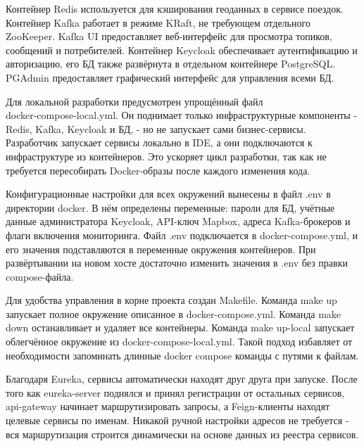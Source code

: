 {\par \redline Контейнер Redis используется для кэширования геоданных в сервисе поездок. Контейнер Kafka работает в режиме KRaft, не требующем отдельного ZooKeeper. Kafka UI предоставляет веб-интерфейс для просмотра топиков, сообщений и потребителей. Контейнер Keycloak обеспечивает аутентификацию и авторизацию, его БД также развёрнута в отдельном контейнере PostgreSQL. PGAdmin предоставляет графический интерфейс для управления всеми БД.

\par \redline Для локальной разработки предусмотрен упрощённый файл \\docker-compose-local.yml. Он поднимает только инфраструктурные компоненты - Redis, Kafka, Keycloak и БД, - но не запускает сами бизнес-сервисы. Разработчик запускает сервисы локально в IDE, а они подключаются к инфраструктуре из контейнеров. Это ускоряет цикл разработки, так как не требуется пересобирать Docker-образы после каждого изменения кода.

\par \redline Конфигурационные настройки для всех окружений вынесены в файл .env в директории docker. В нём определены переменные: пароли для БД, учётные данные администратора Keycloak, API-ключ Mapbox, адреса Kafka-брокеров и флаги включения мониторинга. Файл .env подключается в docker-compose.yml, и его значения подставляются в переменные окружения контейнеров. При развёртывании на новом хосте достаточно изменить значения в .env без правки compose-файла.

\par \redline Для удобства управления в корне проекта создан Makefile. Команда make up запускает полное окружение описанное в docker-compose.yml. Команда make down останавливает и удаляет все контейнеры. Команда make up-local запускает облегчённое окружение из docker-compose-local.yml. Такой подход избавляет от необходимости запоминать длинные docker compose команды с путями к файлам.

\par \redline Благодаря Eureka, сервисы автоматически находят друг друга при запуске. После того как eureka-server поднялся и принял регистрации от остальных сервисов, api-gateway начинает маршрутизировать запросы, а Feign-клиенты находят целевые сервисы по именам. Никакой ручной настройки адресов не требуется - вся маршрутизация строится динамически на основе данных из реестра сервисов.

\par
}

